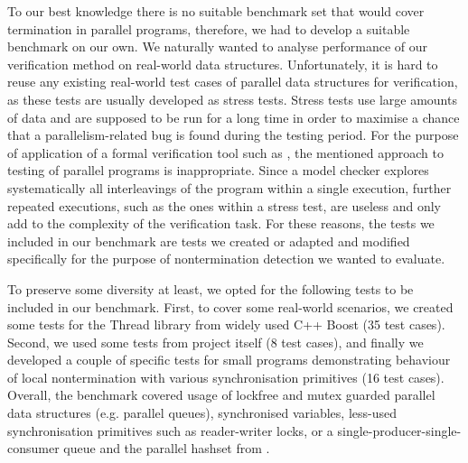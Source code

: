 To our best knowledge there is no suitable benchmark set that would cover
termination in parallel programs, therefore, we had to develop a suitable
benchmark on our own. We naturally wanted to analyse performance of our
verification method on real-world data structures. Unfortunately, it is hard to
reuse any existing real-world test cases of parallel data structures for
verification, as these tests are usually developed as stress tests. Stress
tests use large amounts of data and are supposed to be run for a long time in
order to maximise a chance that a parallelism-related bug is found during the
testing period. For the purpose of application of a formal verification tool such
as \divine, the mentioned approach to testing of parallel programs is
inappropriate. Since a model checker explores systematically all interleavings
of the program within a single execution, further repeated executions, such as
the ones within a stress test, are useless and only add to the complexity of
the verification task. For these reasons, the tests we included in our benchmark
are tests we created or adapted and modified specifically for the purpose of
nontermination detection we wanted to evaluate.

To preserve some diversity at least, we opted for the following tests to be
included in our benchmark.  First, to cover some real-world scenarios, we
created some tests for the Thread library from widely used C++
Boost
(35 test cases). Second, we used some tests from \divine project itself (8 test
cases), and finally we developed a couple of specific tests for small programs
demonstrating behaviour of local nontermination with various synchronisation
primitives (16 test cases). Overall, the benchmark covered usage of lockfree and
mutex guarded parallel data structures (e.g. parallel queues), synchronised
variables, less-used synchronisation primitives such as reader-writer locks, or
a single-producer-single-consumer queue and the parallel hashset from
.

